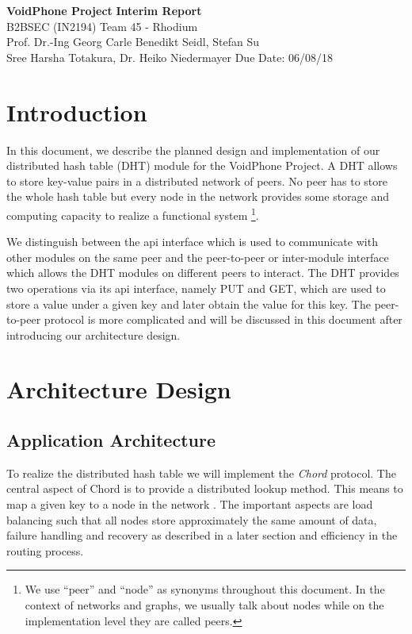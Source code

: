 \documentclass[a4paper, 11pt]{article}
\begin{document}
\noindent
\large\textbf{VoidPhone Project} \hfill \textbf{Interim Report}\\
\normalsize B2BSEC (IN2194)  \hfill Team 45 - Rhodium\\
Prof. Dr.-Ing Georg Carle \hfill Benedikt Seidl, Stefan Su\\
Sree Harsha Totakura, Dr. Heiko Niedermayer \hfill Due Date: 06/08/18

\section*{Introduction}

In this document, we describe the planned design and implementation of our distributed hash table (DHT) module for the VoidPhone Project. A DHT allows to store key-value pairs in a distributed network of peers. No peer has to store the whole hash table but every node in the network provides some storage and computing capacity to realize a functional system \footnote{We use ``peer'' and ``node'' as synonyms throughout this document. In the context of networks and graphs, we usually talk about nodes while on the implementation level they are called peers.}.

We distinguish between the api interface which is used to communicate with other modules on the same peer and the peer-to-peer or inter-module interface which allows the DHT modules on different peers to interact. The DHT provides two operations via its api interface, namely PUT and GET, which are used to store a value under a given key and later obtain the value for this key. The peer-to-peer protocol is more complicated and will be discussed in this document after introducing our architecture design.

\section*{Architecture Design}

\subsection*{Application Architecture}

To realize the distributed hash table we will implement the \textit{Chord} protocol. The central aspect of Chord is to provide a distributed lookup method. This means to map a given key to a node in the network \cite{Chord}. The important aspects are load balancing such that all nodes store approximately the same amount of data, failure handling and recovery as described in a later section and efficiency in the routing process.
\end{document}
